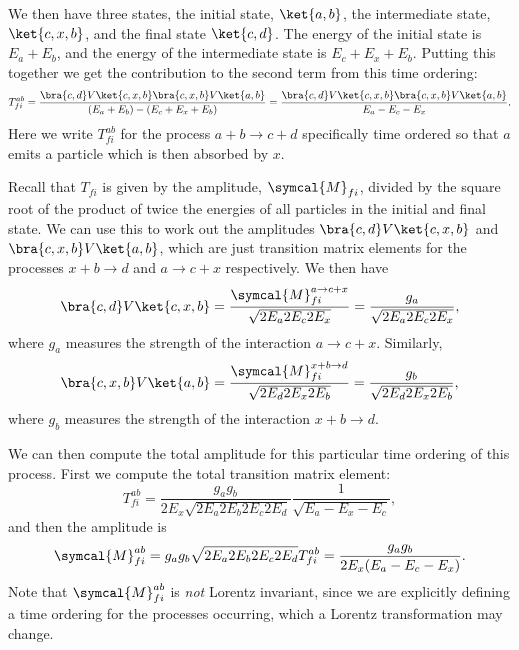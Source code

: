 \documentclass[fleqn]{NotesClass}
\newcommand{\amplitude}{\symcal{M}}
\begin{document}
    We then have three states, the initial state, \(\ket{a, b}\), the intermediate state, \(\ket{c, x, b}\), and the final state \(\ket{c, d}\).
    The energy of the initial state is \(E_a + E_b\), and the energy of the intermediate state is \(E_c + E_x + E_b\).
    Putting this together we get the contribution to the second term from this time ordering:
    \begin{equation}
        T_{fi}^{ab} = \frac{\bra{c, d} V \ket{c, x, b} \bra{c, x, b} V \ket{a, b}}{(E_a + E_b) - (E_c + E_x + E_b)} = \frac{\bra{c, d} V \ket{c, x, b} \bra{c, x, b} V \ket{a, b}}{E_a - E_c - E_x}.
    \end{equation}
    Here we write \(T_{fi}^{ab}\) for the process \(a + b \to c + d\) specifically time ordered so that \(a\) emits a particle which is then absorbed by \(x\).
    
    Recall that \(T_{fi}\) is given by the amplitude, \(\amplitude_{fi}\), divided by the square root of the product of twice the energies of all particles in the initial and final state.
    We can use this to work out the amplitudes \(\bra{c, d} V \ket{c, x, b}\) and \(\bra{c, x, b} V \ket{a, b}\), which are just transition matrix elements for the processes \(x + b \to d\) and \(a \to c + x\) respectively.
    We then have
    \begin{equation}
        \bra{c, d} V \ket{c, x, b} = \frac{\amplitude_{fi}^{a \to c + x}}{\sqrt{2E_a2E_c2E_x}} = \frac{g_a}{\sqrt{2E_a2E_c2E_x}},
    \end{equation}
    where \(g_a\) measures the strength of the interaction \(a \to c + x\).
    Similarly,
    \begin{equation}
        \bra{c, x, b} V \ket{a, b} = \frac{\amplitude_{fi}^{x + b \to d}}{\sqrt{2E_d2E_x2E_b}} = \frac{g_b}{\sqrt{2E_d2E_x2E_b}},
    \end{equation}
    where \(g_b\) measures the strength of the interaction \(x + b \to d\).
    
    We can then compute the total amplitude for this particular time ordering of this process.
    First we compute the total transition matrix element:
    \begin{equation}
        T_{fi}^{ab} = \frac{g_ag_b}{2E_x\sqrt{2E_a2E_b2E_c2E_d}} \frac{1}{\sqrt{E_a - E_x - E_c}},
    \end{equation}
    and then the amplitude is
    \begin{equation}
        \amplitude_{fi}^{ab} = g_ag_b \sqrt{2E_a2E_b2E_c2E_d} T_{fi}^{ab} = \frac{g_ag_b}{2E_x(E_a - E_c - E_x)}.
    \end{equation}
    Note that \(\amplitude_{fi}^{ab}\) is \emph{not} Lorentz invariant, since we are explicitly defining a time ordering for the processes occurring, which a Lorentz transformation may change.
    
\end{document}
